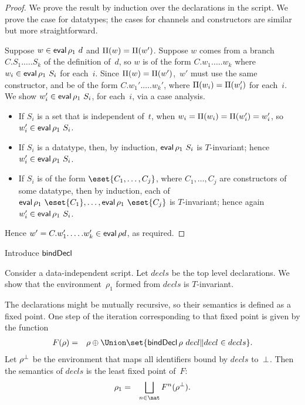 
\begin{proof}
We prove the result by induction over the declarations in the script.  We
prove the case for datatypes; the cases for channels and constructors are
similar but more straightforward.

Suppose $w \in \mathop{\sf eval} \rho_1 ~ d$ and $\Pi(w) = \Pi(w')$.  Suppose $w$
comes from a branch $C.S_1.\ldots.S_k$ of the definition of~$d$, so $w$ is of
the form $C.w_1.\ldots.w_k$ where $w_i \in \mathop{\sf eval} \rho_1 ~ S_i$ for each~$i$.
Since $\Pi(w) = \Pi(w')$,\, $w'$ must use the same constructor, and be
of the form $C.w_1'.\ldots.w_k'$, where $\Pi(w_i) = \Pi(w_i')$ for
each~$i$.  We show $w_i' \in \mathop{\sf eval} \rho_1 ~ S_i$, for each~$i$, via a case
analysis.
%
\begin{itemize}
\item If $S_i$ is a set that is independent of~$t$, when $w_i = \Pi(w_i) =
  \Pi(w_i') = w_i'$, so $w_i' \in \mathop{\sf eval} \rho_1 ~ S_i$.

\item If $S_i$ is a datatype, then, by induction, $\mathop{\sf eval} \rho_1 ~ S_i$ is
  $T$-invariant; hence  $w_i' \in \mathop{\sf eval} \rho_1 ~ S_i$. 

\item If $S_i$ is of the form $\eset{C_1, \ldots, C_j}$, where $C_1, \ldots,
  C_j$ are constructors of some datatype, then by induction, each of $\eval
  \rho_1 ~ \eset{C_1}, \ldots, \eval \rho_1 ~ \eset{C_j}$ is $T$-invariant;
  hence again $w_i' \in \mathop{\sf eval} \rho_1 ~S_i$.
\end{itemize}
%
Hence $w' = C.w_1'.\ldots.w_k' \in \mathop{\sf eval} \rho d$, as required.
\end{proof}


Introduce $\mathop{\sf bindDecl}$

Consider a data-independent script.  Let $decls$ be the top level
declarations.  We show that the environment~$\rho_1$ formed from $decls$ is
$T$-invariant.

The declarations might be mutually recursive, so their semantics is defined as
a fixed point.  One step of the iteration corresponding to that fixed point is
given by the function
%
\begin{eqnarray*}
F(\rho) & = & \rho \oplus \Union \set{\bindDecl \rho ~ decl \| decl \in decls}.
\end{eqnarray*}
%
Let $\rho^\perp$ be the environment that maps all identifiers bound by
$decls$ to~$\perp$.  Then the semantics of $decls$ is the least fixed point
of~$F$: 
\begin{eqnarray*}
\rho_1 & = & \bigsqcup_{n \in \nat} F^n(\rho^\bottom).
\end{eqnarray*}

